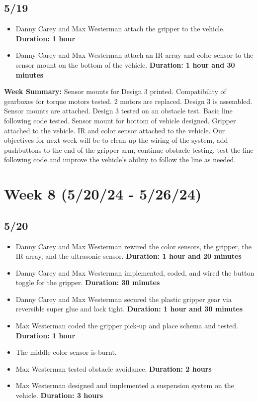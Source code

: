 \documentclass[12pt]{report}
\begin{document}
\subsection*{5/19}

\begin{itemize}
    \item Danny Carey and Max Westerman attach the gripper to the vehicle. \textbf{Duration: 1 hour}
    \item Danny Carey and Max Westerman attach an \gls{IR} array and color sensor to the sensor mount on the bottom of the vehicle. \textbf{Duration: 1 hour and 30 minutes}
\end{itemize}

\textbf{Week Summary:} Sensor mounts for Design 3 printed. Compatibility of gearboxes for torque motors tested. 2 motors are replaced. Design 3 is assembled. Sensor mounts are attached. Design 3 tested on an obstacle test. Basic line following code tested. Sensor mount for bottom of vehicle designed. Gripper attached to the vehicle. \gls{IR} and color sensor attached to the vehicle. Our objectives for next week will be to clean up the wiring of the system, add pushbuttons to the end of the gripper arm, continue obstacle testing, test the line following code and improve the vehicle’s ability to follow the line as needed.

\section{Week 8 (5/20/24 - 5/26/24)}
\subsection*{5/20}

\begin{itemize}
    \item Danny Carey and Max Westerman rewired the color sensors, the gripper, the \gls{IR} array, and the ultrasonic sensor. \textbf{Duration: 1 hour and 20 minutes}
    \item Danny Carey and Max Westerman implemented, coded, and wired the button toggle for the gripper. \textbf{Duration: 30 minutes}
    \item Danny Carey and Max Westerman secured the plastic gripper gear via reversible super glue and lock tight. \textbf{Duration: 1 hour and 30 minutes}
    \item Max Westerman coded the gripper pick-up and place schema and tested. \textbf{Duration: 1 hour}
    \item The middle color sensor is burnt.
    \item Max Westerman tested obstacle avoidance. \textbf{Duration: 2 hours}
    \item Max Westerman designed and implemented a suspension system on the vehicle. \textbf{Duration: 3 hours}
\end{itemize}
\end{document}
